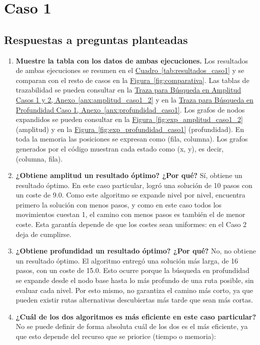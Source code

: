 \documentclass[12pt,a4paper]{article}
\begin{document}
\section{Caso 1}
\subsection{Respuestas a preguntas planteadas}
\begin{enumerate}
  \item \textbf{Muestre la tabla con los datos de ambas ejecuciones.} Los resultados de ambas ejecuciones se resumen en el \hyperref[tab:resultados_caso1]{Cuadro~\ref*{tab:resultados_caso1}} y se comparan con el resto de casos en la \hyperref[fig:comparativa]{Figura~\ref*{fig:comparativa}}. Las tablas de trazabilidad se pueden consultar en la \hyperref[anx:amplitud_caso1_2]{Traza para Búsqueda en Amplitud Casos 1 y 2, Anexo~\ref*{anx:amplitud_caso1_2}} y en la \hyperref[anx:profundidad_caso1]{Traza para Búsqueda en Profundidad Caso 1, Anexo~\ref*{anx:profundidad_caso1}}. Los grafos de nodos expandidos se pueden consultar en la \hyperref[fig:exp_amplitud_caso1_2]{Figura~\ref*{fig:exp_amplitud_caso1_2}} (amplitud) y en la \hyperref[fig:exp_profundidad_caso1]{Figura~\ref*{fig:exp_profundidad_caso1}} (profundidad). En toda la memoria las posiciones se expresan como (fila, columna). Los grafos generados por el código muestran cada estado como (x, y), es decir, (columna, fila).
  \item \textbf{¿Obtiene amplitud un resultado óptimo? ¿Por qué?} Sí, obtiene un resultado óptimo. En este caso particular, logró una solución de 10 pasos con un coste de 9.0. Como este algoritmo se expande nivel por nivel, encuentra primero la solución con menos pasos, y como en este caso todos los movimientos cuestan 1, el camino con menos pasos es también el de menor coste. Esta garantía depende de que los costes sean uniformes: en el Caso 2 deja de cumplirse.
  \item \textbf{¿Obtiene profundidad un resultado óptimo? ¿Por qué?} No, no obtiene un resultado óptimo. El algoritmo entregó una solución más larga, de 16 pasos, con un coste de 15.0. Esto ocurre porque la búsqueda en profundidad se expande desde el nodo base hasta lo más profundo de una ruta posible, sin evaluar cada nivel. Por esto mismo, no garantiza el camino más corto, ya que pueden existir rutas alternativas descubiertas más tarde que sean más cortas.
  \item \textbf{¿Cuál de los dos algoritmos es más eficiente en este caso particular?} No se puede definir de forma absoluta cuál de los dos es el más eficiente, ya que esto depende del recurso que se priorice (tiempo o memoria):

\end{enumerate}
\end{document}
